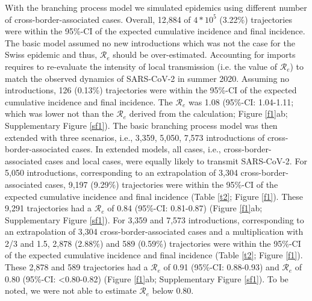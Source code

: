 \documentclass[10pt, a4paper, twoside]{article}
\begin{document}
\begin{multicols}{2}
With the branching process model we simulated epidemics using different number of cross-border-associated cases.
Overall, 12,884 of $4*10^5$ (3.22\%) trajectories were within the 95\%-CI of the expected cumulative incidence and final incidence.
The basic model assumed no new introductions which was not the case for the Swiss epidemic and thus, $\mathcal{R}_e$ should be over-estimated.
Accounting for imports requires to re-evaluate the intensity of local transmission (i.e. the value of $\mathcal{R}_e$) to match the observed dynamics of SARS-CoV-2 in summer 2020.
Assuming no introductions, 126 (0.13\%) trajectories were within the 95\%-CI of the expected cumulative incidence and final incidence.
The $\mathcal{R}_e$ was 1.08 (95\%-CI: 1.04-1.11; which was lower not than the $\mathcal{R}_e$ derived from the calculation; Figure \ref{f1}ab; Supplementary Figure \ref{sf1}).
The basic branching process model was then extended with three scenarios, i.e., 3,359, 5,050, 7,573 introductions of cross-border-associated cases.
In extended models, all cases, i.e., cross-border-associated cases and local cases, were equally likely to transmit SARS-CoV-2.
For 5,050 introductions, corresponding to an extrapolation of 3,304 cross-border-associated cases, 9,197 (9.29\%) trajectories were within the 95\%-CI of the expected cumulative incidence and final incidence (Table \ref{t2}; Figure \ref{f1}).
These 9,291 trajectories had a $\mathcal{R}_e$ of 0.84 (95\%-CI: 0.81-0.87) (Figure \ref{f1}ab; Supplementary Figure \ref{sf1}).
For 3,359 and 7,573 introductions, corresponding to an extrapolation of 3,304 cross-border-associated cases and a multiplication with 2/3 and 1.5, 2,878 (2.88\%) and 589 (0.59\%) trajectories were within the 95\%-CI of the expected cumulative incidence and final incidence (Table \ref{t2}; Figure \ref{f1}).
These 2,878 and 589 trajectories had a $\mathcal{R}_e$ of 0.91 (95\%-CI: 0.88-0.93) and $\mathcal{R}_e$ of 0.80 (95\%-CI: <0.80-0.82) (Figure \ref{f1}ab; Supplementary Figure \ref{sf1}).
To be noted, we were not able to estimate $\mathcal{R}_e$ below 0.80.



\end{multicols}
\end{document}
